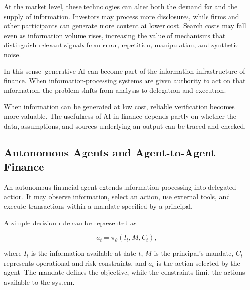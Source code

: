 At the market level, these technologies can alter both the demand for and the supply of information. Investors may process more disclosures, while firms and other participants can generate more content at lower cost. Search costs may fall even as information volume rises, increasing the value of mechanisms that distinguish relevant signals from error, repetition, manipulation, and synthetic noise.

In this sense, generative AI can become part of the information infrastructure of finance. When information-processing systems are given authority to act on that information, the problem shifts from analysis to delegation and execution.


\begin{tcolorbox}[
enhanced,
breakable,
colback=white,
colframe=FinanceBlue,
boxrule=0.7pt,
sharp corners,
borderline west={2.2pt}{0pt}{FinanceBlue},
title=\textbf{Financial Perspective: AI Can Move the Bottleneck from Production to Verification},
coltitle=white,
colbacktitle=FinanceBlue,
fonttitle=\bfseries,
before skip=1.2em,
after skip=1.2em
]

When information can be generated at low cost, reliable verification becomes more valuable. The usefulness of AI in finance depends partly on whether the data, assumptions, and sources underlying an output can be traced and checked.

\end{tcolorbox}

\subsection{Autonomous Agents and Agent-to-Agent Finance}

An autonomous financial agent extends information processing into delegated action. It may observe information, select an action, use external tools, and execute transactions within a mandate specified by a principal.

A simple decision rule can be represented as

\begin{equation}
a_t=\pi_{\theta}(I_t,M,C_t),
\label{eq:ch24-agent-policy}
\end{equation}

where \(I_t\) is the information available at date \(t\), \(M\) is the principal's mandate, \(C_t\) represents operational and risk constraints, and \(a_t\) is the action selected by the agent. The mandate defines the objective, while the constraints limit the actions available to the system.


